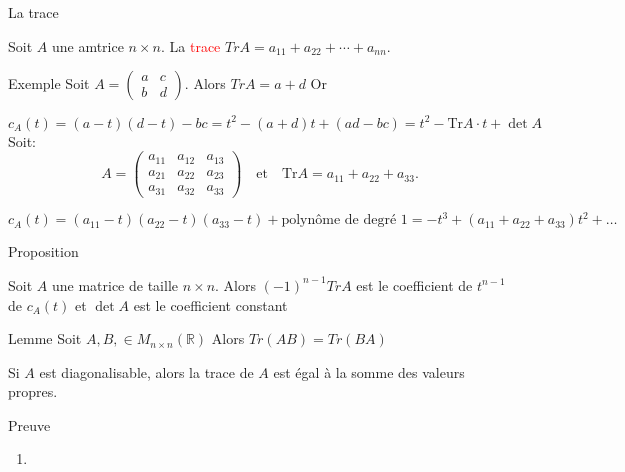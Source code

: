 \begin{parag}{La trace}
    \begin{defintion}
        Soit $A$ une amtrice $n \times n$. La \textcolor{red}{trace} $Tr A = a_{11} + a_{22} + \cdots + a_{nn}$.
    \end{defintion}
    \begin{subparag}{Exemple}
        Soit $A = \begin{pmatrix}
            a & c \\ b & d
        \end{pmatrix}$. Alors $TrA = a + d$ Or

  \[
c_A(t) = (a - t)(d - t) - bc = t^2 - (a + d)t + (ad - bc) = t^2 - \text{Tr}A \cdot t + \det A
\]
Soit:
\[
A = 
\begin{pmatrix}
a_{11} & a_{12} & a_{13} \\
a_{21} & a_{22} & a_{23} \\
a_{31} & a_{32} & a_{33}
\end{pmatrix}
\quad \text{et} \quad \text{Tr}A = a_{11} + a_{22} + a_{33}.
\]

\[
c_A(t) = (a_{11} - t)(a_{22} - t)(a_{33} - t) + \text{polynôme de degré 1}
= -t^3 + (a_{11} + a_{22} + a_{33})t^2 + \dots
\]
    \end{subparag}
    \begin{subparag}{Proposition}
        \begin{theoreme}
            Soit $A$ une matrice de taille $n \times n$. Alors $(-1)^{n-1}TrA$ est le coefficient de $t^{n-1}$ de $c_A(t)$ et $\det A$ est le coefficient constant
        \end{theoreme}

        \begin{theoreme}{Lemme}
            Soit $A, B, \in M_{n \times n}(\mathbb{R}) $ Alors $Tr(AB) = Tr(BA)$
        \end{theoreme}
        \begin{theoreme}
            Si $A$ est diagonalisable, alors la trace de $A$ est égal à la somme des valeurs propres.
        \end{theoreme}
    \end{subparag}
    \begin{subparag}{Preuve}
        \begin{enumerate}
            \item 
            \begin{align*}
                

\end{align*}
\end{enumerate}
\end{subparag}
\end{parag}
